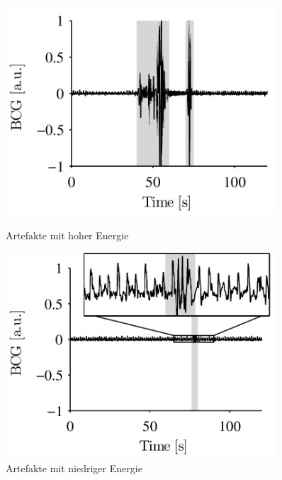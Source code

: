 	\begin{figure}[H]
		\centering
		\begin{minipage}{0.48\linewidth}
			\centering
      		\includegraphics[width=0.9\textwidth]{pic/high-energy-artifacts.png}
			\caption[Artefakte mit hoher Energie]{Artefakte mit hoher Energie}
			\label{fig:high-energy-artifact}
    	\end{minipage}
    	\hfill
    	\begin{minipage}{0.48\linewidth}
    		\centering
      		\includegraphics[width=0.9\textwidth]{pic/low-energy-artifacts.png}
			\caption[Artefakte mit niedriger Energie]{Artefakte mit niedriger Energie}
			\label{fig:low-energy-artifact}
    	\end{minipage}
	\end{figure}
	
